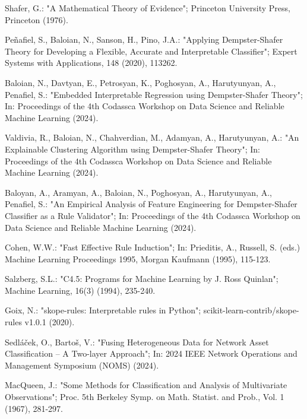 \documentclass[10pt,a4paper,oneside]{article}
\begin{document}
\begin{thebibliography}{}{
\fontsize{9pt}{10pt}\selectfont
{}
Shafer, G.: "A Mathematical Theory of Evidence";
Princeton University Press, Princeton (1976).

Peñafiel, S., Baloian, N., Sanson, H., Pino, J.A.: "Applying Dempster-Shafer Theory for Developing a Flexible, Accurate and Interpretable Classifier";
Expert Systems with Applications, 148 (2020), 113262.

Baloian, N., Davtyan, E., Petrosyan, K., Poghosyan, A., Harutyunyan, A., Penafiel, S.:
"Embedded Interpretable Regression using Dempster-Shafer Theory";
In: Proceedings of the 4th Codassca Workshop on Data Science and Reliable Machine Learning (2024).

Valdivia, R., Baloian, N., Chahverdian, M., Adamyan, A., Harutyunyan, A.:
"An Explainable Clustering Algorithm using Dempster-Shafer Theory";
In: Proceedings of the 4th Codassca Workshop on Data Science and Reliable Machine Learning (2024).

Baloyan, A., Aramyan, A., Baloian, N., Poghosyan, A., Harutyunyan, A., Penafiel, S.:
"An Empirical Analysis of Feature Engineering for Dempster-Shafer Classifier as a Rule Validator";
In: Proceedings of the 4th Codassca Workshop on Data Science and Reliable Machine Learning (2024).

Cohen, W.W.: "Fast Effective Rule Induction";
In: Prieditis, A., Russell, S. (eds.) Machine Learning Proceedings 1995,
Morgan Kaufmann (1995), 115-123.

Salzberg, S.L.: "C4.5: Programs for Machine Learning by J. Ross Quinlan";
Machine Learning, 16(3) (1994), 235-240.

Goix, N.: "skope-rules: Interpretable rules in Python";
scikit-learn-contrib/skope-rules v1.0.1 (2020).

Sedláček, O., Bartoš, V.: "Fusing Heterogeneous Data for Network Asset Classification – A Two-layer Approach";
In: 2024 IEEE Network Operations and Management Symposium (NOMS) (2024).

MacQueen, J.: "Some Methods for Classification and Analysis of Multivariate Observations";
Proc. 5th Berkeley Symp. on Math. Statist. and Prob., Vol. 1 (1967), 281-297.

}
\end{thebibliography}
\end{document}
